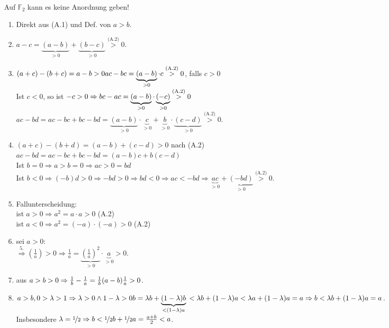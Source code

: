\documentclass[../ana1.tex]{subfiles}
\begin{document}
\begin{bem}
	Auf \(\mathbb{F}_2\) kann es keine Anordnung geben!
\end{bem}
\begin{bew}
	\begin{enumerate}\leavevmode %
		\item Direkt aus (A.1) und Def. von \(a>b\).
		\item \(a-c = \underbrace{(a-b)}_{>0}+\underbrace{(b-c)}_{>0} \overset{\text{(A.2)}}{>} 0\).
		\item \((a+c)-(b+c)=a-b>0\\
			ac-bc=\underbrace{(a-b)}_{>0}\cdot c \overset{\text{(A.2)}}{>}0\), falls \(c>0\) \\
			Ist \(c<0\), so ist \(-c>0\\
			\Rightarrow bc-ac=\underbrace{(a-b)}_{>0}\cdot\underbrace{(-c)}_{>0} \overset{\text{(A.2)}}{>} 0\) \\
			\(ac-bd=ac-bc+bc-bd=\underbrace{(a-b)}_{>0} \cdot \underbrace{c}_{>0} + \underbrace{b}_{>0} \cdot \underbrace{(c-d)}_{>0} \overset{\text{(A.2)}}{>}0\).
		\item \((a+c)-(b+d) = (a-b)+(c-d)>0\) nach (A.2)\\
			\(ac-bd = ac-bc + bc-bd = (a-b)c + b(c-d)\) \\
			Ist \(b=0 \Rightarrow a> b = 0 \Rightarrow ac > 0 = bd\) \\
			Ist \(b<0 \Rightarrow (-b)d > 0 \Rightarrow -bd > 0 \Rightarrow bd < 0 \Rightarrow ac<-bd \Rightarrow \underbrace{ac}_{>0} + \underbrace{(-bd)}_{>0} \overset{\text{(A.2)}}{>} 0\).
		\item  Fallunterscheidung:\\
			ist \(a>0\Rightarrow a^2 = a\cdot a > 0\) (A.2)\\
			ist \(a<0\Rightarrow a^2 = (-a)\cdot(-a) > 0\) (A.2)
		\item sei \(a>0\): \\
			\(\overset{\text{5.}}{\Rightarrow} \left(\frac{1}{a}\right) > 0 \Rightarrow \frac{1}{a} = \underbrace{{\left(\frac{1}{a}\right)}^2}_{>0} \cdot \underbrace{a}_{>0} > 0\).
		\item aus \(a>b>0\\
			\Rightarrow \frac{1}{b} - \frac{1}{a} = \frac{1}{b}(a-b)\frac{1}{a}>0\).
		\item \(a>b, 0>\lambda>1 \Rightarrow \lambda > 0 \wedge 1-\lambda > 0\\
			b=\lambda b + \underbrace{(1-\lambda)b}_{<(1-\lambda)a}\\
			<\lambda b + (1-\lambda) a < \lambda a + (1-\lambda)a = a\\
			\Rightarrow b<\lambda b + (1-\lambda)a =a\).\\
			Insbesondere \(\lambda = \nicefrac{1}{2}\Rightarrow b< \nicefrac{1}{2} b + \nicefrac{1}{2}a = \frac{a+b}{2} < a\).
	\end{enumerate}
\end{bew}
\end{document}

